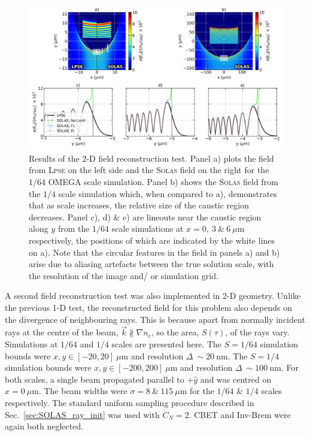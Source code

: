 \begin{figure}[t!]
    \includegraphics[width=1.0\linewidth]{Numerics/Images/2D_field_reconstruction_lineouts_alt.png}
    \centering
    \caption{Results of the 2-D field reconstruction test.
    Panel a) plots the field from \textsc{Lpse} on the left side and the \textsc{Solas} field on the right for the $1/64$ OMEGA scale simulation.
    Panel b) shows the \textsc{Solas} field from the $1/4$ scale simulation which, when compared to a), demonstrates that as scale increases, the relative size of the caustic region decreases.
    Panel c), d) \& e) are lineouts near the caustic region along $y$ from the $1/64$ scale simulations at $x=0,\ 3\ \text{\&}\ 6\ \mu\text{m}$ respectively, the positions of which are indicated by the white lines on a).
    Note that the circular features in the field in panels a) and b) arise due to aliasing artefacts between the true solution scale, with the resolution of the image and/ or simulation grid.}%
    \label{fig:SOLAS_2d_field_test}
\end{figure}

A second field reconstruction test was also implemented in 2-D geometry.
Unlike the previous 1-D test, the reconstructed field for this problem also depends on the divergence of neighbouring rays.
This is because apart from normally incident rays at the centre of the beam, $\vec{k}\nparallel\nabla n_e$, so the area, $S(\tau)$, of the rays vary.
Simulations at $1/64$ and $1/4$ scales are presented here.
The $S=1/64$ simulation bounds were $x,y\in [-20,20]\ \mu\text{m}$ and resolution $\Delta\ \sim 20\ \text{nm}$.
The $S=1/4$ simulation bounds were $x,y\in [-200,200]\ \mu\text{m}$ and resolution $\Delta\ \sim 100\ \text{nm}$.
For both scales, a single beam propagated parallel to $+\hat{y}$ and was centred on $x=0\ \mu\text{m}$.
The beam widths were $\sigma=8\ \text{\&}\ 115\ \mu\text{m}$ for the $1/64$ \& $1/4$ scales respectively.
The standard uniform sampling procedure described in Sec.~\ref{sec:SOLAS_ray_init} was used with $C_N=2$.
\ac{CBET} and \ac{Inv-Brem} were again both neglected.

